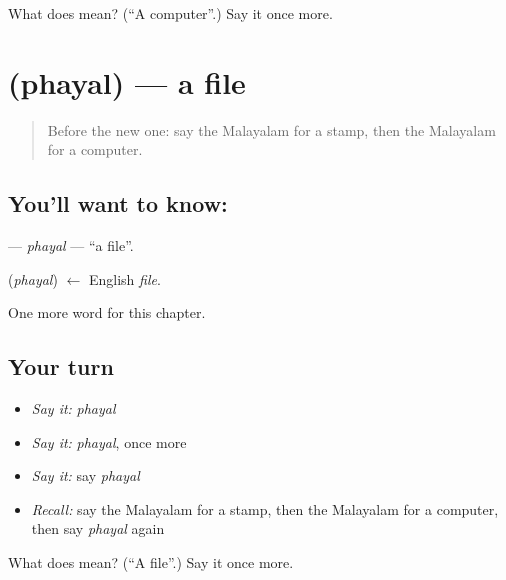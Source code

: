 \begin{tcolorbox}[breakable,colback=teal!4,colframe=teal!35!black,title={Before you move on}]
What does  mean? (\textquotedblleft{}A computer\textquotedblright{}.) Say it once more.
\end{tcolorbox}
\section[\texorpdfstring{\ml{ഫയൽ} (phayal)}{ഫയൽ (phayal)}]{ (phayal) — a file}

\label{lesson:ML-C251-phayal}



\begin{quote}
Before the new one: say the Malayalam for a stamp, then the Malayalam for a computer.
\end{quote}

\subsection*{You'll want to know: }
\textbf{} — \emph{phayal} — \textquotedblleft{}a file\textquotedblright{}.

\begin{cousinweb}
\textbf{} (\emph{phayal}) $\leftarrow$ English \emph{file}.
\end{cousinweb}

\begin{grammarlens}[title={What you've built}]
One more word for this chapter.
\end{grammarlens}

\subsection*{Your turn}
\begin{itemize}
\raggedright
  \item \emph{Say it:} \emph{phayal}
  \item \emph{Say it:} \emph{phayal}, once more
  \item \emph{Say it:} say \emph{phayal}
  \item \emph{Recall:} say the Malayalam for a stamp, then the Malayalam for a computer, then say \emph{phayal} again
\end{itemize}

\begin{tcolorbox}[breakable,colback=teal!4,colframe=teal!35!black,title={Before you move on}]
What does  mean? (\textquotedblleft{}A file\textquotedblright{}.) Say it once more.
\end{tcolorbox}
